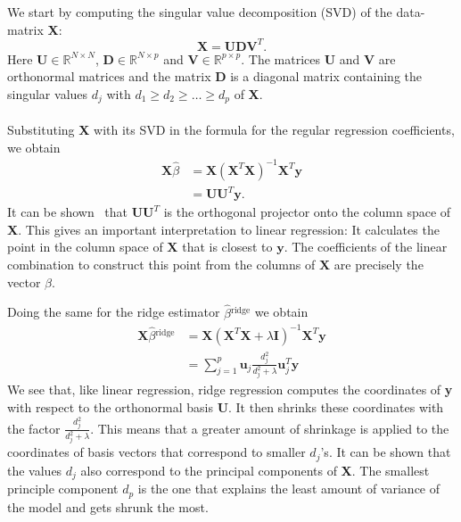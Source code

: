 We start by computing the singular value decomposition (SVD) of the data-matrix \textbf{X}:
\begin{equation*}
    \textbf{X} = \textbf{UDV}^T.
\end{equation*}
Here $\textbf{U} \in \mathbb{R}^{N \times N}$, $\textbf{D} \in \mathbb{R}^{N \times p}$ and $\textbf{V} \in \mathbb{R}^{p \times p}$. The matrices \textbf{U} and \textbf{V} are orthonormal matrices and the matrix \textbf{D} is a diagonal matrix containing the singular values $d_j$ with $d_1 \geqslant d_2 \geqslant \dots \geqslant d_p$ of \textbf{X}.\\
\\
Substituting \textbf{X} with its SVD in the formula for the regular regression coefficients, we obtain
\begin{align*}
    \textbf{X}\hat{\beta} &  = \textbf{X}(\textbf{X}^T\textbf{X})^{-1}\textbf{X}^T\textbf{y}\\
    & = \textbf{U}\textbf{U}^T\textbf{y}.
\end{align*}
It can be shown~\cite{TB1997} that $\textbf{U}\textbf{U}^T$ is the orthogonal projector onto the column space of \textbf{X}. This gives an important interpretation to linear regression: It calculates the point in the column space of $\textbf{X}$ that is closest to $\textbf{y}$. The coefficients of the linear combination to construct this point from the columns of $\textbf{X}$ are precisely the vector $\hat{\beta}$.

Doing the same for the ridge estimator $\hat{\beta}{}^{\textrm{ridge}}$ we obtain
\begin{align*}
    \textbf{X}\hat{\beta}{}^{\textrm{ridge}} & = \textbf{X}(\textbf{X}^T\textbf{X} + \lambda\textbf{I})^{-1}\textbf{X}^T\textbf{y}\\
    & = \sum_{j=1}^p \textbf{u}_j\frac{d_j^2}{d_j^2 + \lambda}\textbf{u}_j^T\textbf{y}
\end{align*}
We see that, like linear regression, ridge regression computes the coordinates of \textbf{y} with respect to the orthonormal basis \textbf{U}. It then shrinks these coordinates with the factor $\frac{d_j^2}{d_j^2 + \lambda}$. This means that a greater amount of shrinkage is applied to the coordinates of basis vectors that correspond to smaller $d_j$'s. It can be shown that the values $d_j$ also correspond to the principal components of \textbf{X}. The smallest principle component $d_p$ is the one that explains the least amount of variance of the model and gets shrunk the most.


